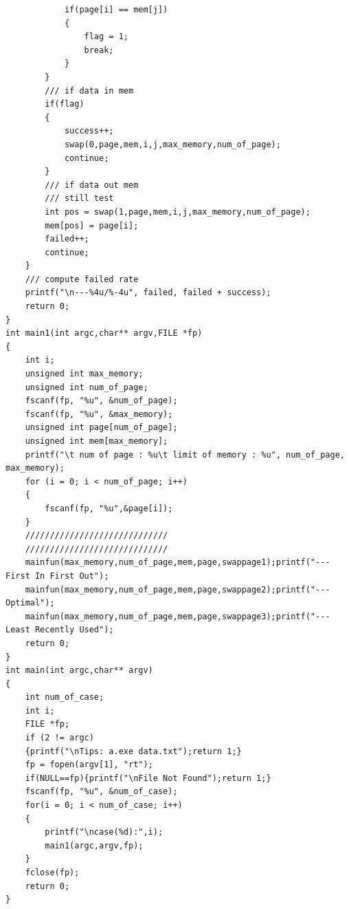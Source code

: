 \documentclass[UTF8]{ctexart}
\begin{document}
\begin{verbatim}
            if(page[i] == mem[j])
            {
                flag = 1;
                break;
            }
        }
        /// if data in mem
        if(flag)
        {
            success++;
            swap(0,page,mem,i,j,max_memory,num_of_page);
            continue;
        }
        /// if data out mem
        /// still test
        int pos = swap(1,page,mem,i,j,max_memory,num_of_page);
        mem[pos] = page[i];
        failed++;
        continue;
    }
    /// compute failed rate
    printf("\n---%4u/%-4u", failed, failed + success);
    return 0;
}
int main1(int argc,char** argv,FILE *fp)
{
    int i;
    unsigned int max_memory;
    unsigned int num_of_page;
    fscanf(fp, "%u", &num_of_page);
    fscanf(fp, "%u", &max_memory);    
    unsigned int page[num_of_page];    
    unsigned int mem[max_memory];
    printf("\t num of page : %u\t limit of memory : %u", num_of_page, max_memory);
    for (i = 0; i < num_of_page; i++)
    {
        fscanf(fp, "%u",&page[i]);
    }
    /////////////////////////////
    /////////////////////////////
    mainfun(max_memory,num_of_page,mem,page,swappage1);printf("---First In First Out");
    mainfun(max_memory,num_of_page,mem,page,swappage2);printf("---Optimal");
    mainfun(max_memory,num_of_page,mem,page,swappage3);printf("---Least Recently Used");
    return 0;
}
int main(int argc,char** argv)
{
    int num_of_case;
    int i;
    FILE *fp;
    if (2 != argc)
    {printf("\nTips: a.exe data.txt");return 1;}
    fp = fopen(argv[1], "rt");
    if(NULL==fp){printf("\nFile Not Found");return 1;}
    fscanf(fp, "%u", &num_of_case);
    for(i = 0; i < num_of_case; i++)
    {
        printf("\ncase(%d):",i);
        main1(argc,argv,fp);
    }
    fclose(fp);
    return 0;
}
\end{verbatim}
\end{document}
